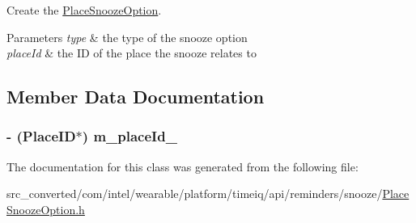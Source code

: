 Create the \hyperlink{interface_place_snooze_option}{Place\+Snooze\+Option}. 


\begin{DoxyParams}{Parameters}
{\em type} & the type of the snooze option \\
\hline
{\em place\+Id} & the I\+D of the place the snooze relates to \\
\hline
\end{DoxyParams}


\subsection{Member Data Documentation}
\hypertarget{interface_place_snooze_option_ae6d8c522854e0cb8ccbe1bc67c2e261e}{}
\subsubsection[{m\+\_\+place\+Id\+\_\+}]{\setlength{\rightskip}{0pt plus 5cm}-\/ (Place\+I\+D$\ast$) m\+\_\+place\+Id\+\_\+}\label{interface_place_snooze_option_ae6d8c522854e0cb8ccbe1bc67c2e261e}


The documentation for this class was generated from the following file\+:\begin{DoxyCompactItemize}
\item 
src\+\_\+converted/com/intel/wearable/platform/timeiq/api/reminders/snooze/\hyperlink{_place_snooze_option_8h}{Place\+Snooze\+Option.\+h}\end{DoxyCompactItemize}
